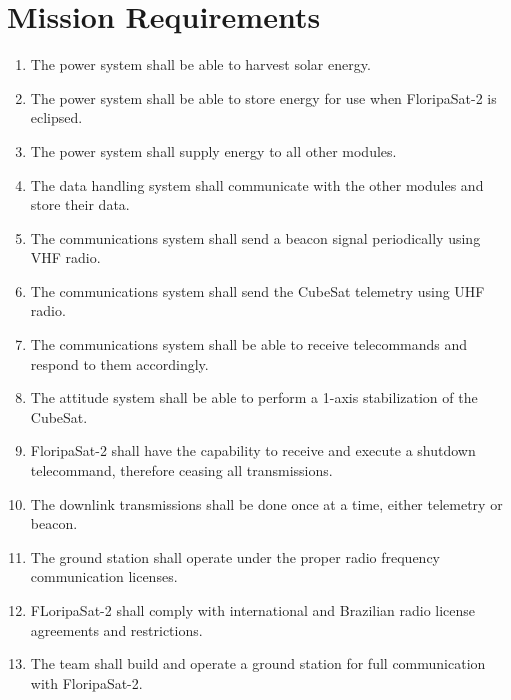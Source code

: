 %
%
%
%
%

%
%
%
%
%
%

\chapter{Mission Requirements} \label{ch:requirements}

\begin{enumerate}
    \item The power system shall be able to harvest solar energy.
    \item The power system shall be able to store energy for use when FloripaSat-2 is eclipsed.
    \item The power system shall supply energy to all other modules.
    \item The data handling system shall communicate with the other modules and store their data.
    \item The communications system shall send a beacon signal periodically using VHF radio.
    \item The communications system shall send the CubeSat telemetry using UHF radio.
    \item The communications system shall be able to receive telecommands and respond to them accordingly.
    \item The attitude system shall be able to perform a 1-axis stabilization of the CubeSat.
    \item FloripaSat-2 shall have the capability to receive and execute a shutdown telecommand, therefore ceasing all transmissions.
    \item The downlink transmissions shall be done once at a time, either telemetry or beacon.
    \item The ground station shall operate under the proper radio frequency communication licenses.
    \item FLoripaSat-2 shall comply with international and Brazilian radio license agreements and restrictions.
    \item The team shall build and operate a ground station for full communication with FloripaSat-2.
\end{enumerate}
